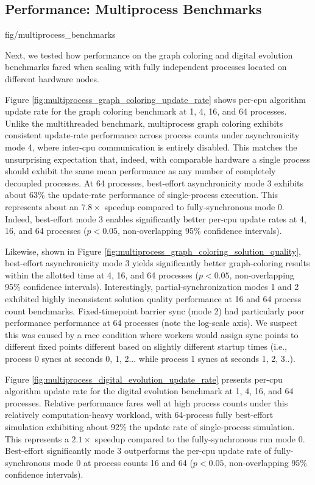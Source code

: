 \subsection{Performance: Multiprocess Benchmarks} \label{sec:multiprocess-benchmarks}

{fig/multiprocess_benchmarks}

Next, we tested how performance on the graph coloring and digital evolution benchmarks fared when scaling with fully independent processes located on different hardware nodes.

Figure \ref{fig:multiprocess_graph_coloring_update_rate} shows per-cpu algorithm update rate for the graph coloring benchmark at 1, 4, 16, and 64 processes.
Unlike the multithreaded benchmark, multiprocess graph coloring exhibits consistent update-rate performance across process counts under asynchronicity mode 4, where inter-cpu communication is entirely disabled.
This matches the unsurprising expectation that, indeed, with comparable hardware a single process should exhibit the same mean performance as any number of completely decoupled processes.
At 64 processes, best-effort asynchronicity mode 3 exhibits about 63\% the update-rate performance of single-process execution.
This represents about an $7.8\times$ speedup compared to fully-synchronous mode 0.
Indeed, best-effort mode 3 enables significantly better per-cpu update rates at 4, 16, and 64 processes ($p < 0.05$, non-overlapping 95\% confidence intervals).

Likewise, shown in Figure \ref{fig:multiprocess_graph_coloring_solution_quality}, best-effort asynchronicity mode 3 yields significantly better graph-coloring results within the allotted time at 4, 16, and 64 processes ($p < 0.05$, non-overlapping 95\% confidence intervals).
Interestingly, partial-synchronization modes 1 and 2 exhibited highly inconsistent solution quality performance at 16 and 64 process count benchmarks.
Fixed-timepoint barrier sync (mode 2) had particularly poor performance performance at 64 processes (note the log-scale axis).
We suspect this was caused by a race condition where workers would assign sync points to different fixed points different based on slightly different startup times (i.e., process 0 syncs at seconds 0, 1, 2... while process 1 syncs at seconds 1, 2, 3..).

Figure \ref{fig:multiprocess_digital_evolution_update_rate} presents per-cpu algorithm update rate for the digital evolution benchmark at 1, 4, 16, and 64 processes.
Relative performance fares well at high process counts under this relatively computation-heavy workload, with 64-process fully best-effort simulation exhibiting about 92\% the update rate of single-process simulation.
This represents a $2.1\times$ speedup compared to the fully-synchronous run mode 0.
Best-effort significantly mode 3 outperforms the per-cpu update rate of fully-synchronous mode 0 at process counts 16 and 64 ($p < 0.05$, non-overlapping 95\% confidence intervals).
